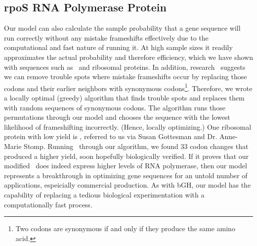 \documentclass[12pt, draft]{article}
\numberwithin{equation}{section}
\begin{document}
\subsection{rpoS RNA Polymerase Protein}
Our model can also calculate the sample probability that a gene sequence will run correctly without any mistake frameshifts
effectively due to the computational and fast nature of running it.
At high sample sizes it readily approximates the actual probability and therefore efficiency, which we have shown with sequences such as
\prfB\ and ribosomal proteins. In addition, research~\cite{rare:yield}
suggests we can remove trouble spots where mistake frameshifts occur by replacing those codons and their
earlier neighbors with synonymous codons\footnote{Two codons are synonymous if and only if they produce the same amino acid.}.
Therefore, we wrote a locally optimal (greedy) algorithm that finds trouble spots and replaces them with random sequences
of synonymous codons. The algorithm runs those permutations through our model and chooses the
sequence with the lowest likelihood of frameshifting incorrectly. (Hence, locally optimizing.) One ribosomal protein with
low yield is \rpoS, referred to us via Susan Gottesman and Dr. Anne-Marie Stomp.
Running \rpoS\ through our algorithm, we found 33 codon changes that produced a higher yield, soon hopefully biologically verified.
If it proves that our modified \rpoS\ does indeed express higher levels
of RNA polymerase, then our model represents a breakthrough in optimizing gene sequences for an untold number of  applications,
espeicially commercial production. As with bGH, our model has the capability of replacing a tedious biological experimentation
with a computationally fast process.

\footnotesize
\begin{singlespace}
  
\end{singlespace}
\end{document}
